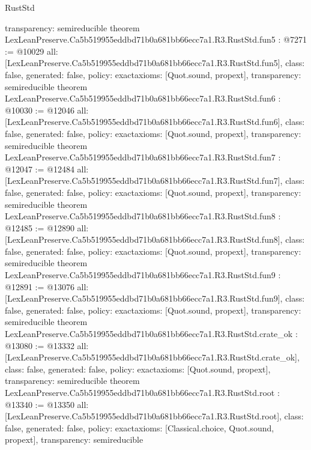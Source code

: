 \begin{lexlean}{RustStd}
\begin{coremodule}
{  transparency: semireducible
}
theorem LexLeanPreserve.Ca5b519955eddbd71b0a681bb66ecc7a1.R3.RustStd.fun5 : @7271 := @10029 {
  all: [LexLeanPreserve.Ca5b519955eddbd71b0a681bb66ecc7a1.R3.RustStd.fun5],
  class: false,
  generated: false,
  policy: exact{axioms: [Quot.sound, propext]},
  transparency: semireducible
}
theorem LexLeanPreserve.Ca5b519955eddbd71b0a681bb66ecc7a1.R3.RustStd.fun6 : @10030 := @12046 {
  all: [LexLeanPreserve.Ca5b519955eddbd71b0a681bb66ecc7a1.R3.RustStd.fun6],
  class: false,
  generated: false,
  policy: exact{axioms: [Quot.sound, propext]},
  transparency: semireducible
}
theorem LexLeanPreserve.Ca5b519955eddbd71b0a681bb66ecc7a1.R3.RustStd.fun7 : @12047 := @12484 {
  all: [LexLeanPreserve.Ca5b519955eddbd71b0a681bb66ecc7a1.R3.RustStd.fun7],
  class: false,
  generated: false,
  policy: exact{axioms: [Quot.sound, propext]},
  transparency: semireducible
}
theorem LexLeanPreserve.Ca5b519955eddbd71b0a681bb66ecc7a1.R3.RustStd.fun8 : @12485 := @12890 {
  all: [LexLeanPreserve.Ca5b519955eddbd71b0a681bb66ecc7a1.R3.RustStd.fun8],
  class: false,
  generated: false,
  policy: exact{axioms: [Quot.sound, propext]},
  transparency: semireducible
}
theorem LexLeanPreserve.Ca5b519955eddbd71b0a681bb66ecc7a1.R3.RustStd.fun9 : @12891 := @13076 {
  all: [LexLeanPreserve.Ca5b519955eddbd71b0a681bb66ecc7a1.R3.RustStd.fun9],
  class: false,
  generated: false,
  policy: exact{axioms: [Quot.sound, propext]},
  transparency: semireducible
}
theorem LexLeanPreserve.Ca5b519955eddbd71b0a681bb66ecc7a1.R3.RustStd.crate_ok : @13080 := @13332 {
  all: [LexLeanPreserve.Ca5b519955eddbd71b0a681bb66ecc7a1.R3.RustStd.crate_ok],
  class: false,
  generated: false,
  policy: exact{axioms: [Quot.sound, propext]},
  transparency: semireducible
}
theorem LexLeanPreserve.Ca5b519955eddbd71b0a681bb66ecc7a1.R3.RustStd.root : @13340 := @13350 {
  all: [LexLeanPreserve.Ca5b519955eddbd71b0a681bb66ecc7a1.R3.RustStd.root],
  class: false,
  generated: false,
  policy: exact{axioms: [Classical.choice, Quot.sound, propext]},
  transparency: semireducible
}


\end{coremodule}
\end{lexlean}
